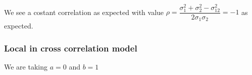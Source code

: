 \documentclass[11pt]{article}
\begin{document}
    \begin{center}
    \end{center}
    { \hspace*{\fill} \\}
    
    We see a costant correlation as expected with value
\(\rho=\dfrac{\sigma_1^2 + \sigma_2^2 - \sigma_{12}^2}{2 \sigma_1 \sigma_2} = -1\)
as expected.

    \subsubsection{Local in cross correlation
model}\label{local-in-cross-correlation-model}

We are taking \(a = 0\) and \(b = 1\)
\end{document}
